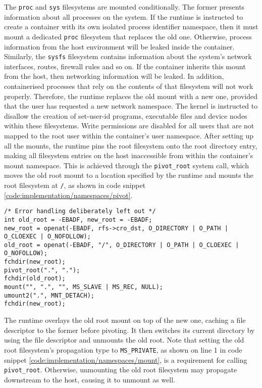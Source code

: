 The \verb|proc| and \verb|sys| filesystems are mounted conditionally. The former presents information
about all processes on the system. If the runtime is instructed to create a container with 
its own isolated process identifier namespace, then it must mount a dedicated \verb|proc|
filesystem that replaces the old one. Otherwise, process information from the host environment 
will be leaked inside the container. Similarly, the \verb|sysfs| filesystem contains information 
about the system's network interfaces, routes, firewall rules and so on. If the container inherits 
this mount from the host, then networking information will be leaked. In addition, containerised 
processes that rely on the contents of that filesystem will not work properly. Therefore, 
the runtime replaces the old mount with a new one, provided that the user has requested a 
new network namespace. The kernel is instructed to disallow the creation of set-user-id programs,
executable files and device nodes within these filesystems. Write permissions are disabled 
for all users that are not mapped to the root user within the container's user namespace. 
After setting up all the mounts, the runtime pins the root filesystem onto the 
root directory entry, making all filesystem entries on the host inaccessible from within the container's mount namespace.
This is achieved through the \verb|pivot_root| system call, which moves 
the old root mount to a location specified by the runtime and mounts the root filesystem at \verb|/|,
as shown in code snippet \ref{code:implementation/namespaces/pivot}.

\begin{lstlisting}[style=c-code-snippets, label={code:implementation/namespaces/pivot}, caption={Swap the old root filesystem with a new one}]
/* Error handling deliberately left out */
int old_root = -EBADF, new_root = -EBADF;
new_root = openat(-EBADF, rfs->cro_dst, O_DIRECTORY | O_PATH | O_CLOEXEC | O_NOFOLLOW);
old_root = openat(-EBADF, "/", O_DIRECTORY | O_PATH | O_CLOEXEC | O_NOFOLLOW);
fchdir(new_root);
pivot_root(".", ".");
fchdir(old_root);
mount("", ".", "", MS_SLAVE | MS_REC, NULL);
umount2(".", MNT_DETACH);
fchdir(new_root);
\end{lstlisting}
The runtime overlays the old root mount on top of the new one, caching a file descriptor to the former 
before pivoting. It then switches its current directory by using the file descriptor and unmounts
the old root. 
Note that setting 
the old root filesystem's propagation type to \verb|MS_PRIVATE|, as shown on line 1 in code snippet 
\ref{code:implementation/namespaces/mount}, is a requirement for calling \verb|pivot_root|.
Otherwise, unmounting the old root filesystem may propagate downstream to the host, causing it to 
unmount as well.

